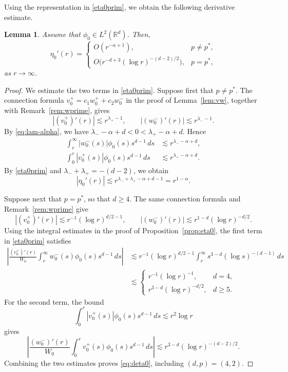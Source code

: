 \documentclass[12pt, a4paper, reqno]{amsart}
\numberwithin{equation}{section}
\newtheorem{lemma}[theorem]{Lemma}
\theoremstyle{definition}
\theoremstyle{remark}
\newcommand{\R}{\mathbb R}
\begin{document}
Using the representation in \eqref{eta0prim}, we obtain the following derivative estimate.

\begin{lemma}
\label{lem:deta0}
Assume that $\phi_0\in L^2(\R^d)$. Then,
\begin{equation}\label{eq:deta0}
  \eta_0'(r)=
  \begin{cases}
    O(r^{-\alpha+1}), & p\ne p^*,\\[2pt]
    O\bigl(r^{-d+3}(\log r)^{-(d-2)/2}\bigr), & p=p^*,
  \end{cases}
\end{equation}
as $r\to\infty$.
\end{lemma}

\begin{proof}
We estimate the two terms in \eqref{eta0prim}.
Suppose first that $p\ne p^*$. The connection formula
$v_0^+=c_1w_0^++c_2w_0^-$ in the proof of Lemma~\ref{lem:vw},
together with Remark~\ref{rem:wprime}, gives
\[
  |(v_0^+)'(r)|\lesssim r^{\lambda_+-1},
  \qquad
  |(w_0^-)'(r)|\lesssim r^{\lambda_--1}.
\]
By \eqref{eq:lam-alpha}, we have $\lambda_--\alpha+d<0<\lambda_+-\alpha+d$.
Hence
\begin{align*}
  \int_r^\infty |w_0^-(s)|\phi_0(s)s^{d-1}\,ds
  &\lesssim r^{\lambda_--\alpha+d},\\
  \int_0^r |v_0^+(s)|\phi_0(s)s^{d-1}\,ds
  &\lesssim r^{\lambda_+-\alpha+d}.
\end{align*}
By \eqref{eta0prim} and $\lambda_-+\lambda_+=-(d-2)$, we obtain
\[
  |\eta_0'(r)|
  \lesssim r^{\lambda_-+\lambda_+-\alpha+d-1}
  =r^{1-\alpha}.
\]

Suppose next that $p=p^*$, so that $d\ge4$.
The same connection formula and Remark~\ref{rem:wprime} give
\[
  |(v_0^+)'(r)|\lesssim r^{-1}(\log r)^{d/2-1},
  \qquad
  |(w_0^-)'(r)|\lesssim r^{1-d}(\log r)^{-d/2}.
\]
Using the integral estimates in the proof of
Proposition~\ref{prop:eta0}, the first term in \eqref{eta0prim}
satisfies
\begin{align*}
  \left|
    \frac{(v_0^+)'(r)}{W_0}
    \int_r^\infty w_0^-(s)\phi_0(s)s^{d-1}\,ds
  \right|
  &\lesssim r^{-1}(\log r)^{d/2-1}
    \int_r^\infty s^{3-d}(\log s)^{-(d-1)}\,ds\\
  &\lesssim
  \begin{cases}
    r^{-1}(\log r)^{-1}, & d=4,\\[2pt]
    r^{3-d}(\log r)^{-d/2}, & d\ge5.
  \end{cases}
\end{align*}
For the second term, the bound
\[
  \int_0^r |v_0^+(s)|\phi_0(s)s^{d-1}\,ds
  \lesssim r^2\log r
\]
gives
\[
  \left|
    \frac{(w_0^-)'(r)}{W_0}
    \int_0^r v_0^+(s)\phi_0(s)s^{d-1}\,ds
  \right|
  \lesssim r^{3-d}(\log r)^{-(d-2)/2}.
\]
Combining the two estimates proves \eqref{eq:deta0}, including $(d,p)=(4,2)$.
\end{proof}
\end{document}
